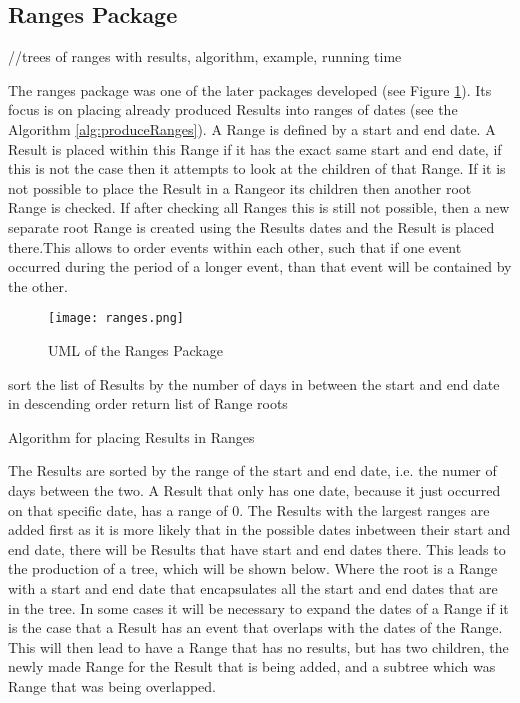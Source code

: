 \subsection{Ranges Package}
//trees of ranges with results, algorithm, example, running time
\par The ranges package was one of the later packages developed (see Figure \ref{fig:ranges}). Its focus is on placing already produced Results into ranges of dates (see the Algorithm \ref{alg:produceRanges}). A Range is defined by a start and end date. A Result is placed within this Range if it has the exact same start and end date, if this is not the case then it attempts to look at the children of that Range. If it is not possible to place the Result in a Rangeor its children then another root Range is checked. If after checking all Ranges this is still not possible, then a new separate root Range is created using the Results dates and the Result is placed there.This allows to order events within each other, such that if one event occurred during the period of a longer event, than that event will be contained by the other. 
\begin{figure}[H]
\caption{UML of the Ranges Package}
\label{fig:ranges}
\texttt{[image: ranges.png]}
\end{figure}
\begin{algorithm}
sort the list of Results by the number of days in between the start and end date in descending order\;
return list of Range roots\;
\caption{Algorithm for placing Results in Ranges}
\label{alg:produceRanges}
\end{algorithm}
\par The Results are sorted by the range of the start and end date, i.e. the numer of days between the two. A Result that only has one date, because it just occurred on that specific date, has a range of 0. The Results with the largest ranges are added first as it is more likely that in the possible dates inbetween their start and end date, there will be Results that have start and end dates there. This leads to the production of a tree, which will be shown below. Where the root is a Range with a start and end date that encapsulates all the start and end dates that are in the tree. In some cases it will be necessary to expand the dates of a Range if it is the case that a Result has an event that overlaps with the dates of the Range. This will then lead to have a Range that has no results, but has two children, the newly made Range for the Result that is being added, and a subtree which was Range that was being overlapped.
